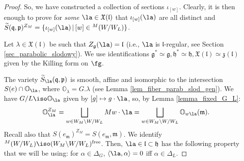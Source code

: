 \documentclass[12pt]{amsart}
\begin{document}
\begin{proof}
So, we have constructed a collection of sections $\iota_{[w]}$.
Clearly, it is then  enough to prove for {\emph{some}} $\la \in \mathfrak{X}(\mathfrak{l})$ that $\iota_{[w]}(\la)$ are all distinct and $\widetilde{S}(\mathfrak{q},\mathfrak{p})^{Z_M}=\{\iota_{[w]}(\la)\,|\, [w] \in {}^M(W/W_L)\}$.

Let $\lambda \in \mathfrak{X}(\mathfrak{l})$ be such that $Z_{\mathfrak{g}}(\la)=\mathfrak{l}$ (i.e., $\la$ is $\mathfrak{l}$-regular, see Section \ref{sec_parabolic_slodowy}).
We use identifications $\mathfrak{g}^* \simeq \mathfrak{g}, \mathfrak{h}^* \simeq \mathfrak{h}, \mathfrak{X}(\mathfrak{l}) \simeq \mathfrak{z}(\mathfrak{l})$ given by the Killing form on $\fg$. 


The variety $\widetilde{S}_\la(\mathfrak{q},\mathfrak{p})$ is smooth, affine and isomorphic to the intersection $S(e) \cap \mathbb{O}_{\la}$, where $\mathbb{O}_\lambda=G.\lambda$ (see Lemma \ref{lem_fiber_parab_slod_gen}). We have $G/L \iso \mathbb{O}_{\la}$ given by $[g] \mapsto g\cdot \la$, so, by Lemma \ref{lemma_fixed_G_L}:
\begin{equation*}
\mathbb{O}_{\la}^{Z_M}=\bigsqcup_{w \in W_M \backslash W/W_L}Mw \cdot \la = \bigsqcup_{w \in W_M \backslash W/W_L} \mathbb{O}_{w\la}(\mathfrak{m}).
\end{equation*}
Recall also that $S(e_{\mathfrak{m}})^{Z_M}=S(e_{\mathfrak{m}},\mathfrak{m})$. We identify ${}^M(W/W_L) \iso (W_M \backslash W / W_L)^{\mathrm{free}}$. Then, $\la \in \mathfrak{l} \subset \mathfrak{h}$ has the following property that we will be using: for $\alpha \in \Delta_G$, $\langle \la,\alpha \rangle = 0$ iff $\alpha \in \Delta_{L}$.  



\end{proof}
\end{document}
